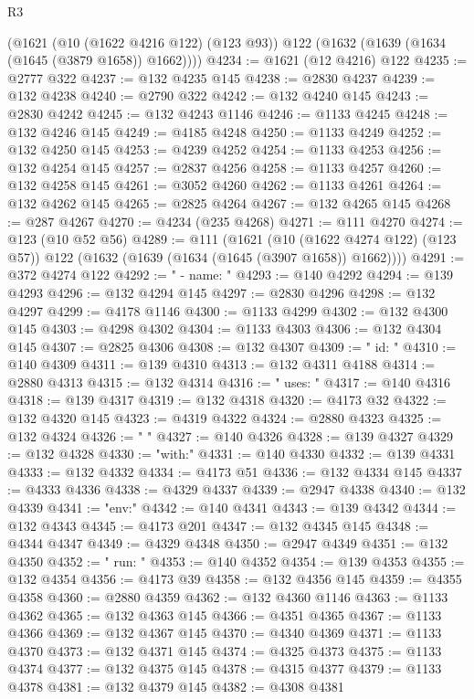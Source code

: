 \begin{lexlean}{R3}
\begin{coremodule}
    (@1621
      (@10 (@1622 @4216 @122) (@123 @93))
      @122
      (@1632 (@1639 (@1634 (@1645 (@3879 @1658)) @1662))))
@4234 := @1621 (@12 @4216) @122
@4235 := @2777 @322
@4237 := @132 @4235 @145
@4238 := @2830 @4237
@4239 := @132 @4238
@4240 := @2790 @322
@4242 := @132 @4240 @145
@4243 := @2830 @4242
@4245 := @132 @4243 @1146
@4246 := @1133 @4245
@4248 := @132 @4246 @145
@4249 := @4185 @4248
@4250 := @1133 @4249
@4252 := @132 @4250 @145
@4253 := @4239 @4252
@4254 := @1133 @4253
@4256 := @132 @4254 @145
@4257 := @2837 @4256
@4258 := @1133 @4257
@4260 := @132 @4258 @145
@4261 := @3052 @4260
@4262 := @1133 @4261
@4264 := @132 @4262 @145
@4265 := @2825 @4264
@4267 := @132 @4265 @145
@4268 := @287 @4267
@4270 := @4234 (@235 @4268)
@4271 := @111 @4270
@4274 := @123 (@10 @52 @56)
@4289 := @111
    (@1621
      (@10 (@1622 @4274 @122) (@123 @57))
      @122
      (@1632 (@1639 (@1634 (@1645 (@3907 @1658)) @1662))))
@4291 := @372 @4274 @122
@4292 := "      - name: "
@4293 := @140 @4292
@4294 := @139 @4293
@4296 := @132 @4294 @145
@4297 := @2830 @4296
@4298 := @132 @4297
@4299 := @4178 @1146
@4300 := @1133 @4299
@4302 := @132 @4300 @145
@4303 := @4298 @4302
@4304 := @1133 @4303
@4306 := @132 @4304 @145
@4307 := @2825 @4306
@4308 := @132 @4307
@4309 := "        id: "
@4310 := @140 @4309
@4311 := @139 @4310
@4313 := @132 @4311 @4188
@4314 := @2880 @4313
@4315 := @132 @4314
@4316 := "        uses: "
@4317 := @140 @4316
@4318 := @139 @4317
@4319 := @132 @4318
@4320 := @4173 @32
@4322 := @132 @4320 @145
@4323 := @4319 @4322
@4324 := @2880 @4323
@4325 := @132 @4324
@4326 := "        "
@4327 := @140 @4326
@4328 := @139 @4327
@4329 := @132 @4328
@4330 := "with:"
@4331 := @140 @4330
@4332 := @139 @4331
@4333 := @132 @4332
@4334 := @4173 @51
@4336 := @132 @4334 @145
@4337 := @4333 @4336
@4338 := @4329 @4337
@4339 := @2947 @4338
@4340 := @132 @4339
@4341 := "env:"
@4342 := @140 @4341
@4343 := @139 @4342
@4344 := @132 @4343
@4345 := @4173 @201
@4347 := @132 @4345 @145
@4348 := @4344 @4347
@4349 := @4329 @4348
@4350 := @2947 @4349
@4351 := @132 @4350
@4352 := "        run: "
@4353 := @140 @4352
@4354 := @139 @4353
@4355 := @132 @4354
@4356 := @4173 @39
@4358 := @132 @4356 @145
@4359 := @4355 @4358
@4360 := @2880 @4359
@4362 := @132 @4360 @1146
@4363 := @1133 @4362
@4365 := @132 @4363 @145
@4366 := @4351 @4365
@4367 := @1133 @4366
@4369 := @132 @4367 @145
@4370 := @4340 @4369
@4371 := @1133 @4370
@4373 := @132 @4371 @145
@4374 := @4325 @4373
@4375 := @1133 @4374
@4377 := @132 @4375 @145
@4378 := @4315 @4377
@4379 := @1133 @4378
@4381 := @132 @4379 @145
@4382 := @4308 @4381

\end{coremodule}
\end{lexlean}
